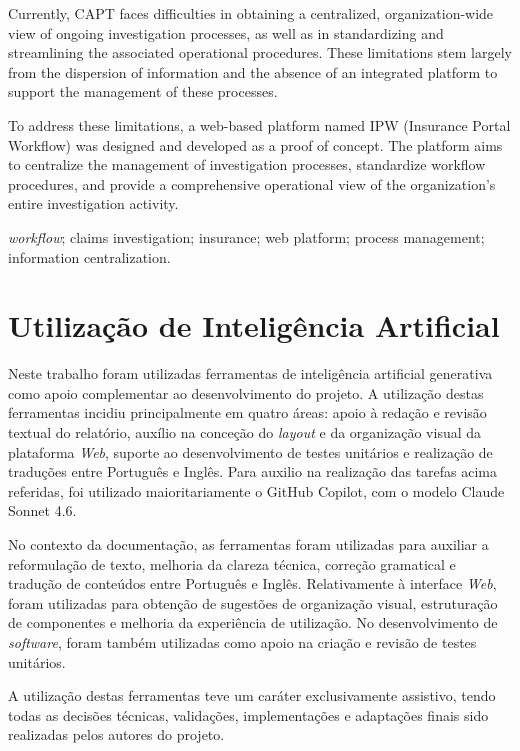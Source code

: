 \documentclass[a4paper,openright,twoside,11pt]{report}
\begin{document}
Currently, CAPT faces difficulties in obtaining a centralized, organization-wide view of ongoing investigation processes, as well as in standardizing and streamlining the associated operational procedures. These limitations stem largely from the dispersion of information and the absence of an integrated platform to support the management of these processes.

To address these limitations, a web-based platform named IPW (Insurance Portal Workflow) was designed and developed as a proof of concept. The platform aims to centralize the management of investigation processes, standardize workflow procedures, and provide a comprehensive operational view of the organization's entire investigation activity.
\bigskip

 \textit{workflow}; claims investigation; insurance; web platform; process management; information centralization.





 
\cleardoublepage
\chapter*{Utilização de Inteligência Artificial}
\noindent
Neste trabalho foram utilizadas ferramentas de inteligência artificial generativa como apoio complementar ao desenvolvimento do projeto. A utilização destas ferramentas incidiu principalmente em quatro áreas: apoio à redação e revisão textual do relatório, auxílio na conceção do \textit{layout} e da organização visual da plataforma \textit{Web}, suporte ao desenvolvimento de testes unitários e realização de traduções entre Português e Inglês.
Para auxilio na realização das tarefas acima referidas, foi utilizado maioritariamente o GitHub Copilot, com o modelo Claude Sonnet 4.6.

No contexto da documentação, as ferramentas foram utilizadas para auxiliar a reformulação de texto, melhoria da clareza técnica, correção gramatical e tradução de conteúdos entre Português e Inglês. Relativamente à interface \textit{Web}, foram utilizadas para obtenção de sugestões de organização visual, estruturação de componentes e melhoria da experiência de utilização. No desenvolvimento de \textit{software}, foram também utilizadas como apoio na criação e revisão de testes unitários.

A utilização destas ferramentas teve um caráter exclusivamente assistivo, tendo todas as decisões técnicas, validações, implementações e adaptações finais sido realizadas pelos autores do projeto.
\end{document}
